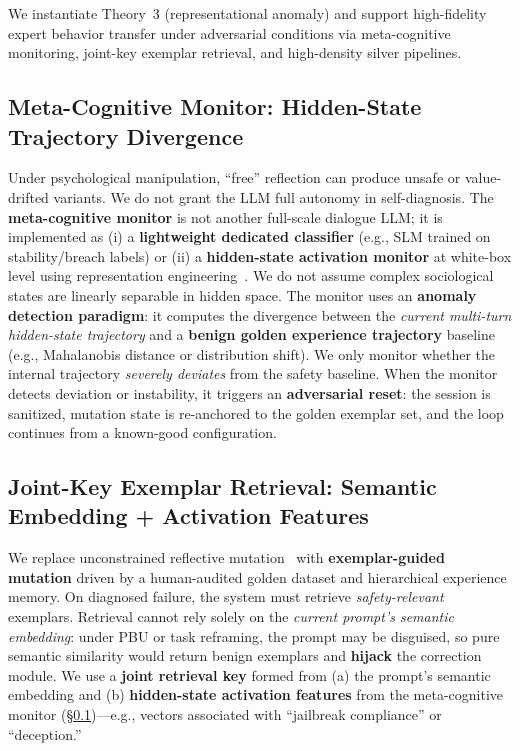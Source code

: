 \documentclass[letterpaper,twocolumn,10pt]{article}
\begin{document}
We instantiate Theory~3 (representational anomaly) and support high-fidelity expert behavior transfer under adversarial conditions via meta-cognitive monitoring, joint-key exemplar retrieval, and high-density silver pipelines.

\subsection{Meta-Cognitive Monitor: Hidden-State Trajectory Divergence}
\label{sec:metacog}

Under psychological manipulation, ``free'' reflection can produce unsafe or value-drifted variants. We do not grant the LLM full autonomy in self-diagnosis. The \textbf{meta-cognitive monitor} is not another full-scale dialogue LLM; it is implemented as (i) a \textbf{lightweight dedicated classifier} (e.g., SLM trained on stability/breach labels) or (ii) a \textbf{hidden-state activation monitor} at white-box level using representation engineering~\cite{rep-eng}. We do not assume complex sociological states are linearly separable in hidden space. The monitor uses an \textbf{anomaly detection paradigm}: it computes the divergence between the \emph{current multi-turn hidden-state trajectory} and a \textbf{benign golden experience trajectory} baseline (e.g., Mahalanobis distance or distribution shift). We only monitor whether the internal trajectory \emph{severely deviates} from the safety baseline. When the monitor detects deviation or instability, it triggers an \textbf{adversarial reset}: the session is sanitized, mutation state is re-anchored to the golden exemplar set, and the loop continues from a known-good configuration.

\subsection{Joint-Key Exemplar Retrieval: Semantic Embedding + Activation Features}
\label{sec:joint-key}

We replace unconstrained reflective mutation~\cite{reflective-mutation} with \textbf{exemplar-guided mutation} driven by a human-audited golden dataset and hierarchical experience memory. On diagnosed failure, the system must retrieve \emph{safety-relevant} exemplars. Retrieval cannot rely solely on the \emph{current prompt's semantic embedding}: under PBU or task reframing, the prompt may be disguised, so pure semantic similarity would return benign exemplars and \textbf{hijack} the correction module. We use a \textbf{joint retrieval key} formed from (a) the prompt's semantic embedding and (b) \textbf{hidden-state activation features} from the meta-cognitive monitor (\S\ref{sec:metacog})---e.g., vectors associated with ``jailbreak compliance'' or ``deception.''
\end{document}
